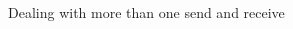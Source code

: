 \documentclass[xcolor={svgnames,usenames}]{beamer}
\begin{document}
\begin{frame}[fragile]{Dealing with more than one send and receive}
\small
\begin{columns}
\begin{column}{0.30\columnwidth}
\end{column}
\end{columns}
\end{frame}
\end{document}

